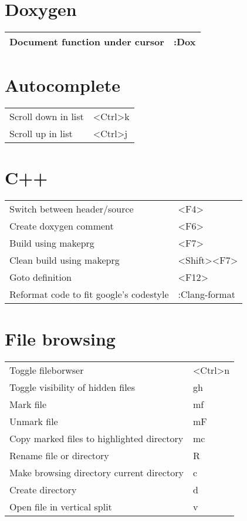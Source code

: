 \documentclass[a4paper]{report}
\def \tablewidth {10cm}
\begin{document}
\section{Doxygen}
\begin{tabularx}{\tablewidth}{| X | l |}
  \hline
  Document function under cursor & :Dox \\
  \hline
\end{tabularx}

\section{Autocomplete}
\begin{tabularx}{\tablewidth}{| X | l |}
  \hline
  Scroll down in list & \textless Ctrl\textgreater k \\
  Scroll up in list & \textless Ctrl\textgreater j \\
  \hline
\end{tabularx}

\section{C++}
\begin{tabularx}{\tablewidth}{| X | l |}
  \hline
  Switch between header/source & \textless F4\textgreater \\
  Create doxygen comment & \textless F6\textgreater \\
  Build using makeprg & \textless F7\textgreater \\
  Clean build using makeprg & \textless Shift\textgreater \textless F7\textgreater \\
  Goto definition & \textless F12\textgreater \\
  Reformat code to fit google's codestyle & :Clang-format \\
  \hline
\end{tabularx}

\section{File browsing}
\begin{tabularx}{\tablewidth}{| X | l |}
  \hline
  Toggle fileborwser & \textless Ctrl\textgreater n \\
  Toggle visibility of hidden files & gh \\
  Mark file & mf \\
  Unmark file & mF \\
  Copy marked files to highlighted directory & mc \\
  Rename file or directory & R \\
  Make browsing directory current directory & c \\
  Create directory & d \\
  Open file in vertical split & v \\

  \hline
\end{tabularx}
\end{document}
